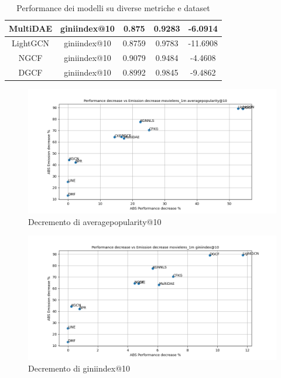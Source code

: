 \begin{table}[H]
{\begin{tabular}{|c|c|c|c|c|}
MultiDAE         & giniindex@10     & 0.875                         & 0.9283                           & -6.0914                              \\ \hline
LightGCN         & giniindex@10     & 0.8759                        & 0.9783                           & -11.6908                             \\ \hline
NGCF             & giniindex@10     & 0.9079                        & 0.9484                           & -4.4608                              \\ \hline
DGCF             & giniindex@10     & 0.8992                        & 0.9845                           & -9.4862                              \\ \hline
\end{tabular}
    }
    \caption{Performance dei modelli su diverse metriche e dataset}
    \end{table}


\begin{figure}[H]
    \centering
    \includegraphics[scale=0.5]{images/decrement_averagepopularity@10_movielens_1m_40_5.png}
    \caption{Decremento di averagepopularity@10}
\end{figure}

\begin{figure}[H]
    \centering
    \includegraphics[scale=0.5]{images/decrement_giniindex@10_movielens_1m_40_5.png}
    \caption{Decremento di giniindex@10}
\end{figure}

